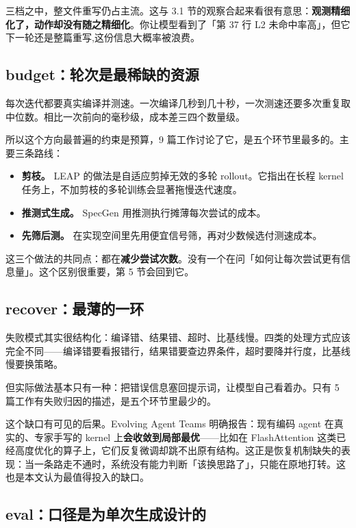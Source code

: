 三档之中，整文件重写仍占主流。这与 3.1 节的观察合起来看很有意思：\textbf{观测精细化了，动作却没有随之精细化}。你让模型看到了「第 37 行 L2 未命中率高」，但它下一轮还是整篇重写,这份信息大概率被浪费。

\subsection{budget：轮次是最稀缺的资源}

每次迭代都要真实编译并测速。一次编译几秒到几十秒，一次测速还要多次重复取中位数。相比一次前向的毫秒级，成本差三四个数量级。

所以这个方向最普遍的约束是预算，9 篇工作讨论了它，是五个环节里最多的。主要三条路线：

\begin{itemize}
\item \textbf{剪枝。} LEAP 的做法是自适应剪掉无效的多轮 rollout。它指出在长程 kernel 任务上，不加剪枝的多轮训练会显著拖慢迭代速度。
\item \textbf{推测式生成。} SpecGen 用推测执行摊薄每次尝试的成本。
\item \textbf{先筛后测。} 在实现空间里先用便宜信号筛，再对少数候选付测速成本。
\end{itemize}

这三个做法的共同点：都在\textbf{减少尝试次数}。没有一个在问「如何让每次尝试更有信息量」。这个区别很重要，第 5 节会回到它。

\subsection{recover：最薄的一环}

失败模式其实很结构化：编译错、结果错、超时、比基线慢。四类的处理方式应该完全不同——编译错要看报错行，结果错要查边界条件，超时要降并行度，比基线慢要换策略。

但实际做法基本只有一种：把错误信息塞回提示词，让模型自己看着办。只有 5 篇工作有失败归因的描述，是五个环节里最少的。

这个缺口有可见的后果。Evolving Agent Teams 明确报告：现有编码 agent 在真实的、专家手写的 kernel 上\textbf{会收敛到局部最优}——比如在 FlashAttention 这类已经高度优化的算子上，它们反复微调却跳不出原有结构。这正是恢复机制缺失的表现：当一条路走不通时，系统没有能力判断「该换思路了」，只能在原地打转。这也是本文认为最值得投入的缺口。

\subsection{eval：口径是为单次生成设计的}

